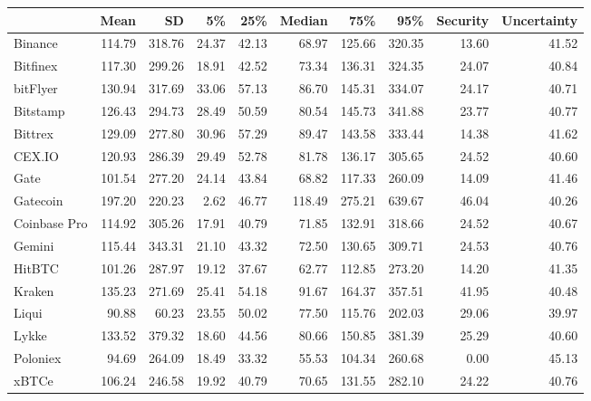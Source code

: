 \begin{tabular}{lrrrrrrrrr}
  \toprule
  & Mean & SD & 5\% & 25\% & Median & 75\% & 95\% & Security & Uncertainty \\ 
  \midrule
Binance & 114.79 & 318.76 & 24.37 & 42.13 & 68.97 & 125.66 & 320.35 & 13.60 & 41.52 \\ 
  Bitfinex & 117.30 & 299.26 & 18.91 & 42.52 & 73.34 & 136.31 & 324.35 & 24.07 & 40.84 \\ 
  bitFlyer & 130.94 & 317.69 & 33.06 & 57.13 & 86.70 & 145.31 & 334.07 & 24.17 & 40.71 \\ 
  Bitstamp & 126.43 & 294.73 & 28.49 & 50.59 & 80.54 & 145.73 & 341.88 & 23.77 & 40.77 \\ 
  Bittrex & 129.09 & 277.80 & 30.96 & 57.29 & 89.47 & 143.58 & 333.44 & 14.38 & 41.62 \\ 
  CEX.IO & 120.93 & 286.39 & 29.49 & 52.78 & 81.78 & 136.17 & 305.65 & 24.52 & 40.60 \\ 
  Gate & 101.54 & 277.20 & 24.14 & 43.84 & 68.82 & 117.33 & 260.09 & 14.09 & 41.46 \\ 
  Gatecoin & 197.20 & 220.23 & 2.62 & 46.77 & 118.49 & 275.21 & 639.67 & 46.04 & 40.26 \\ 
  Coinbase Pro & 114.92 & 305.26 & 17.91 & 40.79 & 71.85 & 132.91 & 318.66 & 24.52 & 40.67 \\ 
  Gemini & 115.44 & 343.31 & 21.10 & 43.32 & 72.50 & 130.65 & 309.71 & 24.53 & 40.76 \\ 
  HitBTC & 101.26 & 287.97 & 19.12 & 37.67 & 62.77 & 112.85 & 273.20 & 14.20 & 41.35 \\ 
  Kraken & 135.23 & 271.69 & 25.41 & 54.18 & 91.67 & 164.37 & 357.51 & 41.95 & 40.48 \\ 
  Liqui & 90.88 & 60.23 & 23.55 & 50.02 & 77.50 & 115.76 & 202.03 & 29.06 & 39.97 \\ 
  Lykke & 133.52 & 379.32 & 18.60 & 44.56 & 80.66 & 150.85 & 381.39 & 25.29 & 40.60 \\ 
  Poloniex & 94.69 & 264.09 & 18.49 & 33.32 & 55.53 & 104.34 & 260.68 & 0.00 & 45.13 \\ 
  xBTCe & 106.24 & 246.58 & 19.92 & 40.79 & 70.65 & 131.55 & 282.10 & 24.22 & 40.76 \\ 
   \bottomrule
\end{tabular}
